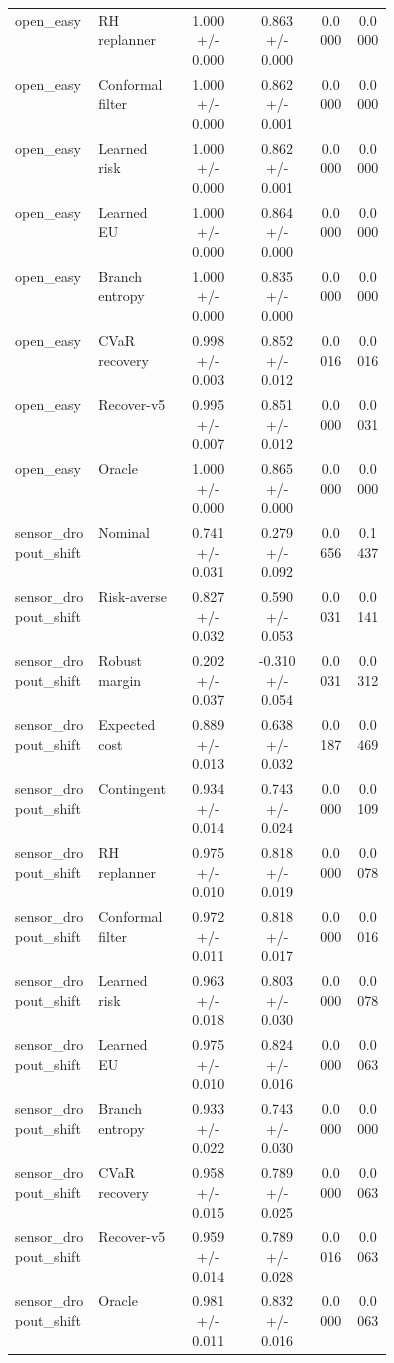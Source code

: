 \documentclass{article}
\begin{document}
\begin{center}
\begin{longtable}{p{0.22\linewidth}p{0.22\linewidth}cccc}
open\_easy & RH replanner & 1.000 +/- 0.000 & 0.863 +/- 0.000 & 0.0000 & 0.0000\\
open\_easy & Conformal filter & 1.000 +/- 0.000 & 0.862 +/- 0.001 & 0.0000 & 0.0000\\
open\_easy & Learned risk & 1.000 +/- 0.000 & 0.862 +/- 0.001 & 0.0000 & 0.0000\\
open\_easy & Learned EU & 1.000 +/- 0.000 & 0.864 +/- 0.000 & 0.0000 & 0.0000\\
open\_easy & Branch entropy & 1.000 +/- 0.000 & 0.835 +/- 0.000 & 0.0000 & 0.0000\\
open\_easy & CVaR recovery & 0.998 +/- 0.003 & 0.852 +/- 0.012 & 0.0016 & 0.0016\\
open\_easy & Recover-v5 & 0.995 +/- 0.007 & 0.851 +/- 0.012 & 0.0000 & 0.0031\\
open\_easy & Oracle & 1.000 +/- 0.000 & 0.865 +/- 0.000 & 0.0000 & 0.0000\\
sensor\_dropout\_shift & Nominal & 0.741 +/- 0.031 & 0.279 +/- 0.092 & 0.0656 & 0.1437\\
sensor\_dropout\_shift & Risk-averse & 0.827 +/- 0.032 & 0.590 +/- 0.053 & 0.0031 & 0.0141\\
sensor\_dropout\_shift & Robust margin & 0.202 +/- 0.037 & -0.310 +/- 0.054 & 0.0031 & 0.0312\\
sensor\_dropout\_shift & Expected cost & 0.889 +/- 0.013 & 0.638 +/- 0.032 & 0.0187 & 0.0469\\
sensor\_dropout\_shift & Contingent & 0.934 +/- 0.014 & 0.743 +/- 0.024 & 0.0000 & 0.0109\\
sensor\_dropout\_shift & RH replanner & 0.975 +/- 0.010 & 0.818 +/- 0.019 & 0.0000 & 0.0078\\
sensor\_dropout\_shift & Conformal filter & 0.972 +/- 0.011 & 0.818 +/- 0.017 & 0.0000 & 0.0016\\
sensor\_dropout\_shift & Learned risk & 0.963 +/- 0.018 & 0.803 +/- 0.030 & 0.0000 & 0.0078\\
sensor\_dropout\_shift & Learned EU & 0.975 +/- 0.010 & 0.824 +/- 0.016 & 0.0000 & 0.0063\\
sensor\_dropout\_shift & Branch entropy & 0.933 +/- 0.022 & 0.743 +/- 0.030 & 0.0000 & 0.0000\\
sensor\_dropout\_shift & CVaR recovery & 0.958 +/- 0.015 & 0.789 +/- 0.025 & 0.0000 & 0.0063\\
sensor\_dropout\_shift & Recover-v5 & 0.959 +/- 0.014 & 0.789 +/- 0.028 & 0.0016 & 0.0063\\
sensor\_dropout\_shift & Oracle & 0.981 +/- 0.011 & 0.832 +/- 0.016 & 0.0000 & 0.0063\\
\bottomrule
\end{longtable}
\normalsize
\end{center}
\end{document}
